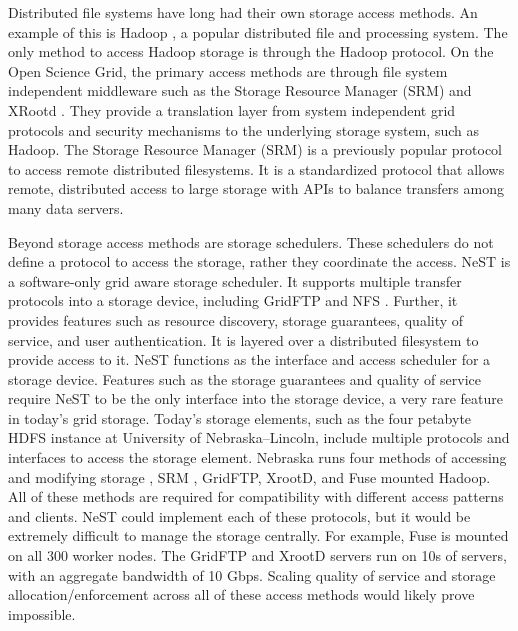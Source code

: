 Distributed file systems have long had their own storage access methods.  An example of this is Hadoop \cite{white2012hadoop}, a popular distributed file and processing system.  The only method to access Hadoop storage is through the Hadoop protocol.  On the Open Science Grid, the primary access methods are through file system independent middleware such as the Storage Resource Manager (SRM) \cite{shoshani2002storage} and XRootd \cite{dorigo2005xrootd}.  They provide a translation layer from system independent grid protocols and security mechanisms to the underlying storage system, such as Hadoop.  The Storage Resource Manager (SRM) is a previously popular protocol to access remote distributed filesystems.  It is a standardized protocol that allows remote, distributed access to large storage with APIs to balance transfers among many data servers.


Beyond storage access methods are storage schedulers.  These schedulers do not define a protocol to access the storage, rather they coordinate the access.  NeST \cite{bent2002flexibility} is a software-only grid aware storage scheduler.  It supports multiple transfer protocols into a storage device, including GridFTP \cite{allcock2005globus} and NFS \cite{walsh1985overview}.  Further, it provides features such as resource discovery, storage guarantees, quality of service, and user authentication.  It is layered over a distributed filesystem to provide access to it.  NeST functions as the interface and access scheduler for a storage device.  Features such as the storage guarantees and quality of service require NeST to be the only interface into the storage device, a very rare feature in today's grid storage.  Today's storage elements, such as the four petabyte HDFS instance at University of Nebraska--Lincoln, include multiple protocols and interfaces to access the storage element.  Nebraska runs four methods of accessing and modifying storage \cite{attebury2009hadoop}, SRM \cite{shoshani2002storage}, GridFTP, XrootD, and Fuse \cite{szeredi2010fuse} mounted Hadoop.  All of these methods are required for compatibility with different access patterns and clients.  NeST could implement each of these protocols, but it would be extremely difficult to manage the storage centrally.  For example, Fuse is mounted on all 300 worker nodes.  The GridFTP and XrootD servers run on 10s of servers, with an aggregate bandwidth of 10 Gbps.  Scaling quality of service and storage allocation/enforcement across all of these access methods would likely prove impossible.

